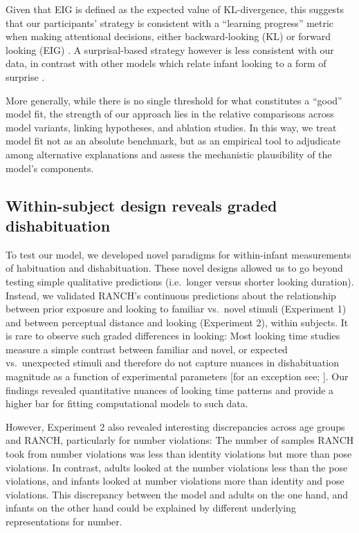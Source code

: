 \documentclass[
]{article}
\begin{document}
Given that EIG is defined as the expected value of KL-divergence, this suggests that our participants' strategy is consistent with a ``learning progress'' metric when making attentional decisions, either backward-looking (KL) or forward looking (EIG) \cite{haber2018learning}. A surprisal-based strategy however is less consistent with our data, in contrast with other models which relate infant looking to a form of surprise \autocite{teglas2011pure,kidd2012goldilocks}.

More generally, while there is no single threshold for what constitutes a “good” model fit, the strength of our approach lies in the relative comparisons across model variants, linking hypotheses, and ablation studies. In this way, we treat model fit not as an absolute benchmark, but as an empirical tool to adjudicate among alternative explanations and assess the mechanistic plausibility of the model’s components.

\hypertarget{within-subjects-design-reveals-graded-dishabituation}{%
\subsection{Within-subject design reveals graded dishabituation}\label{within-subjects-design-reveals-graded-dishabituation}}

To test our model, we developed novel paradigms for within-infant measurements of habituation and dishabituation. These novel designs allowed us to go beyond testing simple qualitative predictions (i.e.~longer versus shorter looking duration). Instead, we validated RANCH's continuous predictions about the relationship between prior exposure and looking to familiar vs.~novel stimuli (Experiment 1) and between perceptual distance and looking (Experiment 2), within subjects. It is rare to observe such graded differences in looking: Most looking time studies measure a simple contrast between familiar and novel, or expected vs.~unexpected stimuli and therefore do not capture nuances in dishabituation magnitude as a function of experimental parameters {[}for an exception see; \textcite{teglas2011pure}{]}.
Our findings revealed quantitative nuances of looking time patterns and provide a higher bar for fitting computational models to such data.

However, Experiment 2 also revealed interesting discrepancies across age groups and RANCH, particularly for number violations: The number of samples RANCH took from number violations was less than identity violations but more than pose violations. In contrast, adults looked at the number violations less than the pose violations, and infants looked at number violations more than identity and pose violations. This discrepancy between the model and adults on the one hand, and infants on the other hand could be explained by different underlying representations for number. 
\end{document}
